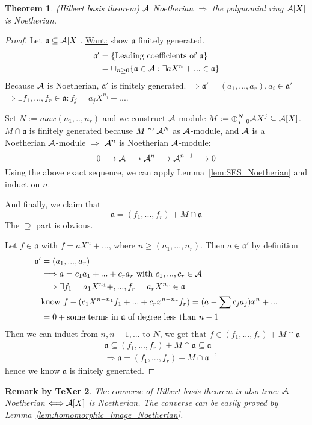 \documentclass[11pt]{article}
\newtheorem{thm}{Theorem}[section]
\newtheorem{rmkt}[thm]{Remark by TeXer}
\newcommand{\sca}{{\mathfrak a}}
\newcommand{\cala}{{\cal A}}
\newcommand{\Lrta}{\Longrightarrow}
\newcommand{\lrta}{\longrightarrow}
\newcommand{\Llrta}{\Longleftrightarrow}
\begin{document}
\begin{thm}\label{thm:Hilbert_Basis}(Hilbert basis theorem)
$\cala$ Noetherian $\Lrta $ the polynomial ring $\cala[X]$ is Noetherian.
\end{thm}

\begin{proof}
Let $\sca\subseteq \cala[X]$. \underline{Want:} show $\sca$ finitely generated. 
$$
\begin{aligned}
\sca' &=\{\text{Leading coefficients of $\sca$}\}\\
&= \cup_{n\geq 0}\{\sca\in\cala: \exists a X^n+...\in \sca\}
\end{aligned}
$$
Because $\cala$ is  Noetherian, $\sca'$ is finitely generated. $\Lrta\sca'=(a_1,...,a_r),a_i\in \sca'$ $\Lrta\exists f_1,...,f_r\in \sca: f_j=a_j X^{n_j}+...$.


Set $N:=max(n_1,..,n_r)$ and we construct $\cala$-module $M:=\oplus^N_{j=0}\cala X^j\subseteq \cala[X]$. $M\cap \sca$ is finitely generated because $M\cong \cala^N$ as $\cala$-module, and $\cala$ is a Noetherian $\cala$-module $\Lrta$ $\cala^n$ is Noetherian $\cala$-module:
$$
0\lrta \cala\lrta \cala^n\lrta \cala^{n-1}\lrta 0
$$
Using the above exact sequence, we can apply Lemma~\ref{lem:SES_Noetherian} and induct on $n$.

And finally, we claim that
$$
\sca=(f_1,...,f_r)+M\cap\sca
$$
The $\supseteq$ part is obvious.

Let $f\in \sca$ with $f=aX^n+...$, where $n\geq (n_1,...,n_r)$. Then $a\in\sca'$ by definition
$$
\begin{aligned}
\sca' &=(a_1,...,a_r)\\
&\Lrta a=c_1 a_1+...+c_r a_r\text{ with } c_1,...,c_r\in \cala\\
&\Lrta \exists f_1=a_1 X^{n_1}+,..., f_r=a_r X^{n_r}\in\sca\\
&\text{know } f-(c_1 X^{n-n_1}f_1+...+c_r x^{n-n_r}f_r)=(a-\sum c_j a_j)x^n+...\\
&=0+ \text{some terms in $\sca$ of degree less than $n-1$}
\end{aligned}
$$
Then we can induct from $n,n-1,...$ to $N$, we get that $f\in (f_1,...,f_r)+M\cap\sca$
$$
\begin{aligned}
&\sca\subseteq (f_1,...,f_r)+M\cap\sca\subseteq \sca\\
&\Lrta\sca=(f_1,...,f_r)+M\cap \sca
\end{aligned},
$$
hence we know $\sca$ is finitely generated.
\end{proof}
\begin{rmkt}
The converse of Hilbert basis theorem is also true: $\cala$ Noetherian $\Llrta\cala[X]$ is Noetherian. The converse can be easily proved by Lemma~\ref{lem:homomorphic_image_Noetherian}.
\end{rmkt}
\end{document}
